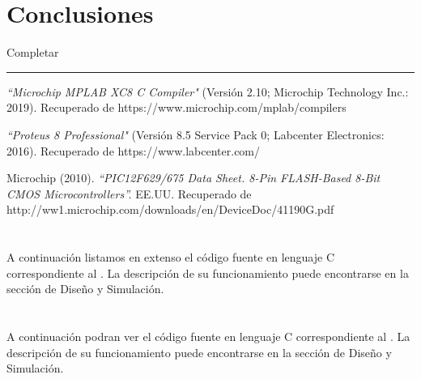 \documentclass[a4paper]{article}
\let\originalappendix\appendix
\renewcommand{\appendix}{%
    \newpage\originalappendix\pagenumbering{gobble}%
    \renewcommand\thesection{Anexo \Alph{section}}
    \setcounter{secnumdepth}{1}
}
\begin{document}
\section{Conclusiones}

Completar

\noindent\rule{\textwidth}{1pt}

\begin{thebibliography}{9}

\textit{``Microchip MPLAB XC8 C Compiler"}
(Versión 2.10; Microchip Technology Inc.: 2019).
Recuperado de https://www.microchip.com/mplab/compilers

\textit{``Proteus 8 Professional"} 
(Versión 8.5 Service Pack 0; Labcenter Electronics: 2016).
Recuperado de https://www.labcenter.com/

Microchip (2010).
\textit{``PIC12F629/675 Data Sheet. 8-Pin FLASH-Based 8-Bit CMOS 
Microcontrollers''.}
EE.UU. Recuperado de 
http://ww1.microchip.com/downloads/en/DeviceDoc/41190G.pdf

\end{thebibliography}


\appendix

\section{}
A continuación listamos en extenso el código fuente en lenguaje C
correspondiente al . La descripción de su 
funcionamiento puede encontrarse en la sección de Diseño y 
Simulación.

%

\newpage
\section{}
A continuación podran ver el  código fuente en lenguaje C correspondiente
al . La descripción de su funcionamiento puede encontrarse en
la sección de Diseño y Simulación.

%
\end{document}
